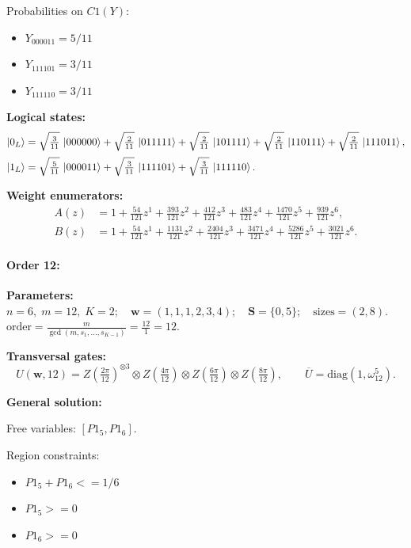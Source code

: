 \documentclass[11pt]{article}
\begin{document}
Probabilities on $C1 (Y)$:
\begin{itemize}
    \item $Y_{000011} = 5/11$
    \item $Y_{111101} = 3/11$
    \item $Y_{111110} = 3/11$
\end{itemize}

\noindent\textbf{Logical states:}
\begin{align*}
\ket{0_L} &= \sqrt{\tfrac{3}{11}}\,\ket{000000} + \sqrt{\tfrac{2}{11}}\,\ket{011111} + \sqrt{\tfrac{2}{11}}\,\ket{101111} + \sqrt{\tfrac{2}{11}}\,\ket{110111} + \sqrt{\tfrac{2}{11}}\,\ket{111011},
\\[2pt]
\ket{1_L} &= \sqrt{\tfrac{5}{11}}\,\ket{000011} + \sqrt{\tfrac{3}{11}}\,\ket{111101} + \sqrt{\tfrac{3}{11}}\,\ket{111110}.
\end{align*}

\noindent\textbf{Weight enumerators:}
\begin{align*}
A(z) &= 1 + \tfrac{54}{121}z^{1} + \tfrac{393}{121}z^{2} + \tfrac{412}{121}z^{3} + \tfrac{483}{121}z^{4} + \tfrac{1470}{121}z^{5} + \tfrac{939}{121}z^{6},\\[2pt]
B(z) &= 1 + \tfrac{54}{121}z^{1} + \tfrac{1131}{121}z^{2} + \tfrac{2404}{121}z^{3} + \tfrac{3471}{121}z^{4} + \tfrac{5286}{121}z^{5} + \tfrac{3021}{121}z^{6}.
\end{align*}

\paragraph{\textbf{Order 12:}}
\noindent\textbf{Parameters:} $n=6,\; m=12,\; K=2;\quad \mathbf w=(1, 1, 1, 2, 3, 4);\quad \mathbf S=\{0, 5\};\quad \text{sizes}=\left(2, 8\right).$ $\displaystyle \text{order}=\frac{m}{\gcd(m,s_1,\dots,s_{K-1})}=\frac{12}{1}=12.$

\noindent\textbf{Transversal gates:}
\[
    U(\mathbf w,12)=Z \left(\tfrac{2\pi}{12}\right)^{\otimes3} \otimes Z \left(\tfrac{4\pi}{12}\right) \otimes Z \left(\tfrac{6\pi}{12}\right) \otimes Z \left(\tfrac{8\pi}{12}\right),\qquad
    \overline U=\mathrm{diag}(1,\omega_{12}^{5}).
\]

\noindent\textbf{General solution:}

Free variables: $[P1_5, P1_6]$.

Region constraints:
\begin{itemize}
    \item $P1_5 + P1_6 <= 1/6$
    \item $P1_5 >= 0$
    \item $P1_6 >= 0$
\end{itemize}
\end{document}
